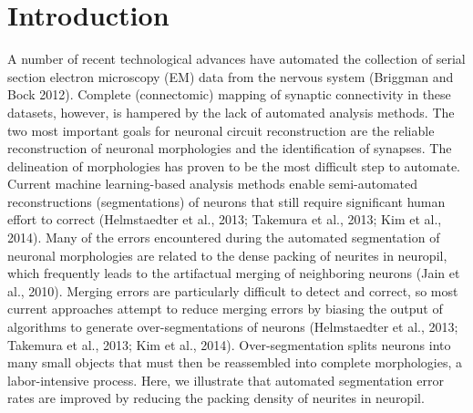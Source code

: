 \documentclass{article}
\begin{document}
\section*{Introduction}

A number of recent technological advances have automated the collection of serial section electron microscopy (EM) data from the nervous system (Briggman and Bock 2012). Complete (connectomic) mapping of synaptic connectivity in these datasets, however, is hampered by the lack of automated analysis methods. The two most important goals for neuronal circuit reconstruction are the reliable reconstruction of neuronal morphologies and the identification of synapses. The delineation of morphologies has proven to be the most difficult step to automate. Current machine learning-based analysis methods enable semi-automated reconstructions (segmentations) of neurons that still require significant human effort to correct (Helmstaedter et al., 2013; Takemura et al., 2013; Kim et al., 2014). Many of the errors encountered during the automated segmentation of neuronal morphologies are related to the dense packing of neurites in neuropil, which frequently leads to the artifactual merging of neighboring neurons (Jain et al., 2010). Merging errors are particularly difficult to detect and correct, so most current approaches attempt to reduce merging errors by biasing the output of algorithms to generate over-segmentations of neurons (Helmstaedter et al., 2013; Takemura et al., 2013; Kim et al., 2014). Over-segmentation splits neurons into many small objects that must then be reassembled into complete morphologies, a labor-intensive process. Here, we illustrate that automated segmentation error rates are improved by reducing the packing density of neurites in neuropil.
\end{document}
